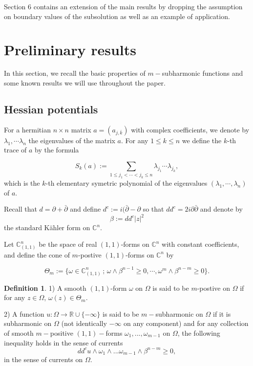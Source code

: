\documentclass[12pt]{amsart}
\theoremstyle{definition}
\newtheorem{definition}[theorem]{Definition}
\numberwithin{theorem}{section}
\numberwithin{equation}{section}
\newcommand{\C}{\mathbb{C}}
\begin{document}
 \smallskip

 Section 6 contains an extension of the main results by dropping the assumption on boundary values of the subsolution as well as an example of  application.

\section{Preliminary results}
 In this section, we recall the basic properties of $m-$subharmonic functions and some known results we will use  throughout the paper. 
 
\subsection{Hessian potentials}
 For a hermitian $n \times n$ matrix $a = (a_{j,\bar k})$ with complex coefficients, we denote by $\lambda_1, \cdots \lambda_n$ the eigenvalues of the matrix $a$. For any $1 \leq k \leq n$ we define the $k$-th trace of $a$ by the formula

$$
S_k (a) := \sum_{1 \leq j_1 < \cdots < j_k \leq n} \lambda_{j_1} \cdots \lambda_{j_k},
$$
which is the $k$-th elementary symetric polynomial of the eigenvalues $(\lambda_1, \cdots, \lambda_n)$ of $a$.

 Recall that $d = \partial + \bar{\partial}$ and define $d^c := i (\bar{\partial} - \partial$ so that $dd^c = 2 i \partial \bar{\partial}$ and denote by 
 $$
 \beta := dd^c \vert z\vert^2
 $$
  the standard K\"ahler form on $\C^n$.
 
 Let $\C^n_{(1,1)} $ be the space of real $(1, 1)$-forms on $\C^n$  with constant
coefficients, and define the cone of $m$-postive  $(1,1)$-forms on $\C^n$ by

$$
\Theta_m := \{\omega \in \C^n_{(1,1)}  \, ; \,  \omega \wedge  \beta^{n - 1} \geq 0, \cdots,  \omega^m \wedge  \beta^{n - m} \geq 0\}.
$$

 
\begin{definition}
1) A smooth $(1,1)$-form $\omega$ on $\Omega$ is said to be $m$-postive on $\Omega$ if for any $z \in \Omega$, $\omega (z) \in \Theta_m$.

2) A function $u:\Omega \rightarrow \mathbb{R}\cup\{-\infty\}$ is said to be  $m-$subharmonic  on $\Omega$ if it is subharmonic on $\Omega$ (not identically $-\infty$ on any component) and  for any collection of smooth $m-$positive $(1,1)-$forms  $\omega_1,...,\omega_{m-1}$ on $\Omega$, the following inequality holds in the sense of currents 
  $$
  dd^c u\wedge \omega_1\wedge...\omega_{m-1} \wedge \beta^{n-m}\geq 0,
  $$
  in the sense of currents on $\Omega$.
\end{definition}
\end{document}
